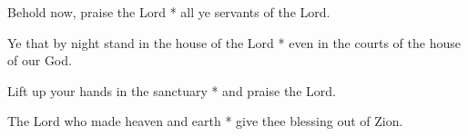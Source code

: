 Behold now, praise the Lord * all ye servants of the Lord.

Ye that by night stand in the house of the Lord * even in the courts of the house of our God.

Lift up your hands in the sanctuary * and praise the Lord.

The Lord who made heaven and earth * give thee blessing out of Zion.